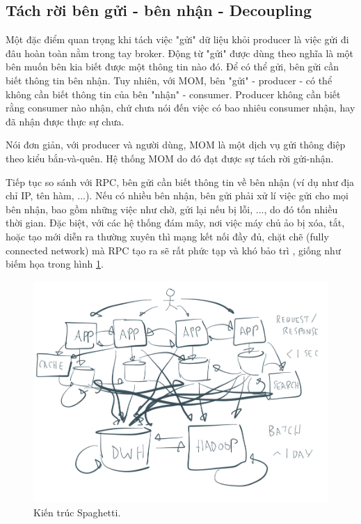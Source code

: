 \documentclass{article}
\begin{document}
\subsection{Tách rời bên gửi - bên nhận - Decoupling}

Một đặc điểm quan trọng khi tách việc "gửi" dữ liệu khỏi producer là việc gửi đi
đâu hoàn toàn nằm trong tay broker. Động từ "gửi" được dùng theo nghĩa là một
bên muốn bên kia biết được một thông tin nào đó. Để có thể gửi, bên gửi cần biết
thông tin bên nhận. Tuy nhiên, với MOM, bên "gửi" - producer - có thể không cần
biết thông tin của bên "nhận" - consumer. Producer không cần biết rằng consumer
nào nhận, chứ chưa nói đến việc có bao nhiêu consumer nhận, hay đã nhận được
thực sự chưa.

Nói đơn giản, với producer và người dùng, MOM là một dịch vụ gửi thông điệp theo
kiểu bắn-và-quên. Hệ thống MOM do đó đạt được sự tách rời gửi-nhận.

Tiếp tục so sánh với RPC, bên gửi cần biết thông tin về bên nhận (ví dụ như địa
chỉ IP, tên hàm, ...). Nếu có nhiều bên nhận, bên gửi phải xử lí việc gửi cho
mọi bên nhận, bao gồm những việc như chờ, gửi lại nếu bị lỗi, ..., do đó tốn
nhiều thời gian. Đặc biệt, với các hệ thống đám mây, nơi việc máy chủ ảo bị xóa,
tắt, hoặc tạo mới diễn ra thường xuyên thì mạng kết nối đầy đủ, chặt chẽ (fully
connected network) mà RPC tạo ra sẽ rất phức tạp và khó bảo trì
\cite{Kleppmann17C}, giống như biếm họa trong hình
\ref{spaghetti_architectures}.

\begin{figure}[H]
    \centering
    \includegraphics[scale=0.5]{spaghetti_architectures.png}
    \caption{Kiến trúc Spaghetti\texttrademark \cite{confluent2018}.}
    \label{spaghetti_architectures}
\end{figure}
\end{document}
